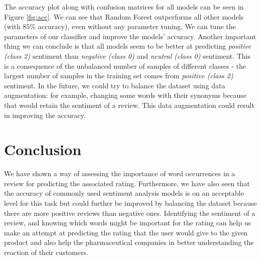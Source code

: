 \documentclass{article}
\begin{document}
The accuracy plot along with confusion matrices for all models can be seen in Figure \ref{fig:acc}. We can see that Random Forest outperforms all other models (with $85\%$ accuracy), even without any parameter tuning. We can tune the parameters of our classifier and improve the models' accuracy. Another important thing we can conclude is that all models seem to be better at predicting \textit{positive (class 2)} sentiment than \textit{negative (class 0)} and \textit{neutral (class 0)} sentiment. This is a consequence of the unbalanced number of samples of different classes - the largest number of samples in the training set comes from \textit{positive (class 2)} sentiment. In the future, we could try to balance the dataset using data augmentation: for example, changing some words with their synonyms because that would retain the sentiment of a review. This data augmentation could result in improving the accuracy.


\section{Conclusion}

We have shown a way of assessing the importance of word occurrences in a review for predicting the associated rating. Furthermore, we have also seen that the accuracy of commonly used sentiment analysis models is on an acceptable level for this task but could further be improved by balancing the dataset because there are more positive reviews than negative ones.
Identifying the sentiment of a review, and knowing which words might be important for
the rating can help us make an attempt at predicting the rating that the user would give to the given product and also help the pharmaceutical companies in better understanding the reaction of their
customers.
\printbibliography
\end{document}
